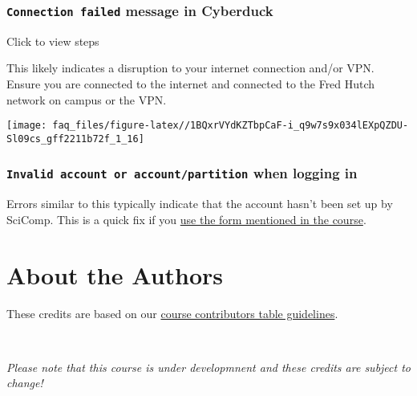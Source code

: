\documentclass[
]{book}
\begin{document}
\hypertarget{connection-failed-message-in-cyberduck}{%
\subsection*{\texorpdfstring{\texttt{Connection\ failed} message in Cyberduck}{Connection failed message in Cyberduck}}\label{connection-failed-message-in-cyberduck}}

Click to view steps

This likely indicates a disruption to your internet connection and/or VPN. Ensure you are connected to the internet and connected to the Fred Hutch network on campus or the VPN.

\texttt{[image: faq\_files/figure-latex//1BQxrVYdKZTbpCaF-i\_q9w7s9x034lEXpQZDU-Sl09cs\_gff2211b72f\_1\_16]}

\hypertarget{invalid-account-or-accountpartition-when-logging-in}{%
\subsection*{\texorpdfstring{\texttt{Invalid\ account\ or\ account/partition} when logging in}{Invalid account or account/partition when logging in}}\label{invalid-account-or-accountpartition-when-logging-in}}

Errors similar to this typically indicate that the account hasn't been set up by SciComp. This is a quick fix if you \href{account-setup.html\#pi-account}{use the form mentioned in the course}.

\hypertarget{about-the-authors}{%
\chapter*{About the Authors}\label{about-the-authors}}

These credits are based on our \href{https://github.com/jhudsl/OTTR_Template/wiki/How-to-give-credits}{course contributors table guidelines}.

~
~

\emph{Please note that this course is under developmnent and these credits are subject to change!}
\end{document}
